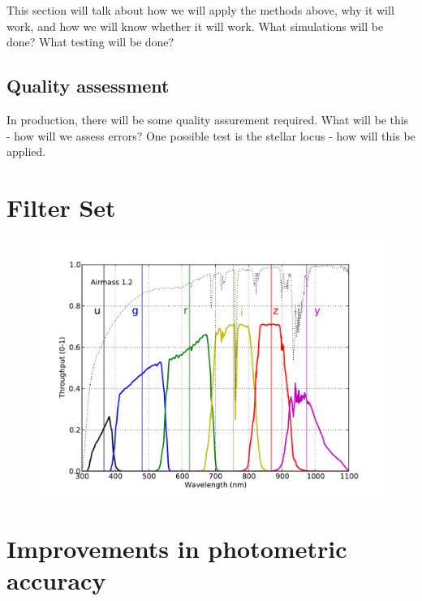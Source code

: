 \documentclass[12pt,preprint]{aastex}
\begin{document}
This section will talk about how we will apply the methods above, why
it will work, and how we will know whether it will work. What
simulations will be done? What testing
will be done? 


\subsection{Quality assessment}
In production, there will be some quality assurement required. What
will be this - how will we assess errors? 
One possible test is the stellar locus - how will this be applied.


\appendix





\section{Filter Set}

\begin{figure}[ht]
\includegraphics[width=5in]{filters}
\end{figure}


\section{Improvements in photometric accuracy}
\end{document}
